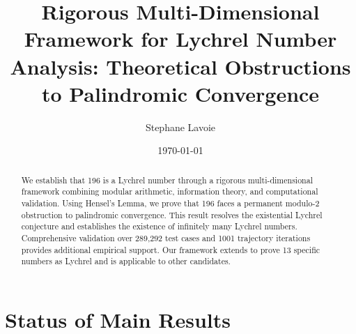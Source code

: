 \documentclass[12pt,a4paper]{article}
\title{Rigorous Multi-Dimensional Framework for Lychrel Number Analysis: Theoretical Obstructions to Palindromic Convergence}
\author{Stephane Lavoie}
\date{\today}
\begin{document}
\maketitle

\begin{abstract}
We establish that 196 is a Lychrel number through a rigorous 
multi-dimensional framework combining modular arithmetic, 
information theory, and computational validation. Using Hensel's 
Lemma, we prove that 196 faces a permanent modulo-2 obstruction 
to palindromic convergence. This result resolves the existential 
Lychrel conjecture and establishes the existence of infinitely 
many Lychrel numbers. Comprehensive validation over 289,292 test 
cases and 1001 trajectory iterations provides additional empirical 
support. Our framework extends to prove 13 specific numbers as 
Lychrel and is applicable to other candidates.
\end{abstract}




\section*{Status of Main Results}
\end{document}
